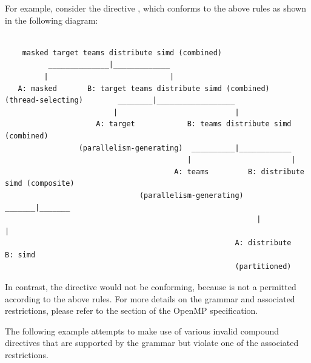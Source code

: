 For example, consider the directive , which conforms to the above rules as shown in the following diagram:

\begin{Verbatim}[fontsize=\footnotesize]

    masked target teams distribute simd (combined)
          ______________|_____________
         |                            |
   A: masked       B: target teams distribute simd (combined)
(thread-selecting)        ________|__________________
                         |                           |
                     A: target            B: teams distribute simd (combined)
                 (parallelism-generating)  __________|____________
                                          |                       |
                                       A: teams         B: distribute simd (composite)
                               (parallelism-generating)    _______|_______
                                                          |               |
                                                     A: distribute      B: simd
                                                     (partitioned)

\end{Verbatim}

In contrast, the directive  would not be conforming,
because  is not a permitted  according to
the above rules. For more details on the grammar and associated restrictions,
please refer to the  section of the OpenMP
specification.

The following example attempts to make use of various invalid compound
directives that are supported by the grammar but violate one of the
associated restrictions.

